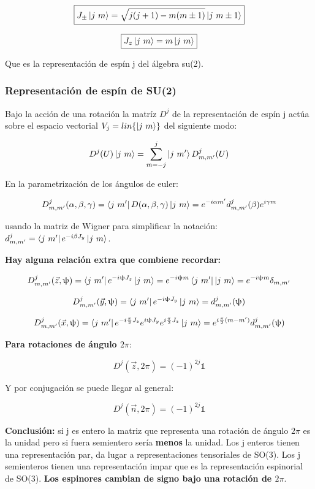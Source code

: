 \documentclass{article}
\begin{document}
$$\boxed{J_\pm \ket{j \ m}=\sqrt{j(j+1)-m(m \pm 1)}\ket{ j \ m \pm 1}}$$

$$\boxed{J_z \ket{j \ m} =m \ket{ j \ m}}$$

Que es la representación de espín j del álgebra su(2).

\subsubsection{Representación de espín de SU(2)}

Bajo la acción de una rotación la matríz $D^j$ de la representación de espín j actúa sobre el espacio vectorial $V_j=lin \lbrace \ket{ j \ m } \rbrace$ del siguiente modo:

$$D^j(U)\ket{j \ m} = \sum _{m=-j}^j \ket{j \ m '}D^j_{m,m'}(U)$$

En la parametrización de los ángulos de euler:

$$D^j_{m,m'}(\alpha , \beta , \gamma)= \bra{j \ m'} D(\alpha , \beta , \gamma ) \ket{j \ m} = e^{-i\alpha m'}d^{j}_{m,m'}(\beta) e^{i\gamma m}$$

usando la matriz de Wigner para simplificar la notación: $d^j_{m,m'}=\bra{j \ m'} e^{-i\beta J_y} \ket{j \ m}$.

\textbf{ Hay alguna relación extra que combiene recordar:}

$$D^j_{m,m'}(\Vec{z},\uppsi)= \bra{j \ m'} e^{-i\uppsi J_z} \ket{j \ m}=e^{-i\uppsi m} \bra{j \ m'} \ket{j \ m}=e^{-i\uppsi m} \delta _{m,m'}$$

$$D^j_{m,m'}(\Vec{y},  \uppsi
) = \bra{j \ m'} e^{-i\uppsi J_y} \ket{j \ m} = d^j_{m,m'}(\uppsi)$$

$$D^j_{m,m'}(\Vec{x},\uppsi)= \bra{j \ m'} e^{-i\frac{\pi}{2} J_z}e^{i\uppsi J_y} e^{i\frac{\pi}{2}J_z} \ket{j \ m}=e^{i\frac{\pi}{2}(m-m')}d^j_{m,m'}(\uppsi)$$

\smallskip

\textbf{Para rotaciones de ángulo $2 \pi$}:

$$D^j(\Vec{z},2\pi)= (-1)^{2j} \mathds{1}$$

\smallskip
Y por conjugación se puede llegar al general:

$$D^j(\Vec{n},2\pi)=(-1)^{2j}\mathds{1}$$

\textbf{Conclusión:} si j es entero la matriz que representa una rotación de ángulo $2\pi$ es la unidad pero si fuera semientero sería \textbf{menos} la unidad. Los j enteros tienen una representación par, da lugar a representaciones tensoriales de SO(3). Los j semienteros tienen una representación impar que es la representación espinorial de SO(3). \textbf{Los espinores cambian de signo bajo una rotación de $2\pi$}.
\end{document}
